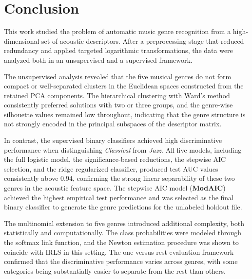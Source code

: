 \section{Conclusion}

This work studied the problem of automatic music genre recognition from a high-dimensional set of acoustic descriptors. After a preprocessing stage that reduced redundancy and applied targeted logarithmic transformations, the data were analyzed both in an unsupervised and a supervised framework.

The unsupervised analysis revealed that the five musical genres do not form compact or well-separated clusters in the Euclidean spaces constructed from the retained PCA components. The hierarchical clustering with Ward's method consistently preferred solutions with two or three groups, and the genre-wise silhouette values remained low throughout, indicating that the genre structure is not strongly encoded in the principal subspaces of the descriptor matrix.

In contrast, the supervised binary classifiers achieved high discriminative performance when distinguishing \textit{Classical} from \textit{Jazz}. All five models, including the full logistic model, the significance-based reductions, the stepwise AIC selection, and the ridge regularized classifier, produced test AUC values consistently above \(0.94\), confirming the strong linear separability of these two genres in the acoustic feature space. The stepwise AIC model (\textbf{ModAIC}) achieved the highest empirical test performance and was selected as the final binary classifier to generate the genre predictions for the unlabeled holdout file.

The multinomial extension to five genres introduced additional complexity, both statistically and computationally. The class probabilities were modeled through the softmax link function, and the Newton estimation procedure was shown to coincide with IRLS in this setting. The one-versus-rest evaluation framework confirmed that the discriminative performance varies across genres, with some categories being substantially easier to separate from the rest than others.
